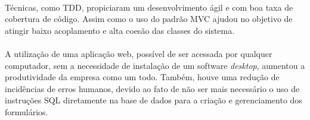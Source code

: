 \documentclass[11pt]{article}
\begin{document}
    \paragraph{}
    Técnicas, como TDD, propiciaram um desenvolvimento ágil e com boa taxa 
    de cobertura de código. Assim como o uso do padrão MVC ajudou no objetivo de atingir baixo acoplamento
    e alta coesão das classes do sistema.
    
    \paragraph{}
    A utilização de uma aplicação web, possível de ser acessada por
    qualquer computador, sem a necessidade de instalação de um software 
    {\em desktop}, aumentou a produtividade da empresa como um todo. Também,
    houve uma redução de incidências de erros humanos, devido ao fato de não ser mais necessário o
    uso de instruções SQL diretamente na base de dados para a criação e gerenciamento dos formulários.

  \newpage
  {}
  
  
\end{document}

